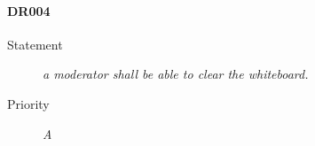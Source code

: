 
\paragraph{DR004}
\begin{description}
  \item [Statement] 
  \textit{ a moderator shall be able to clear the whiteboard.}
\item [Priority] \textit{A}
\end{description}


